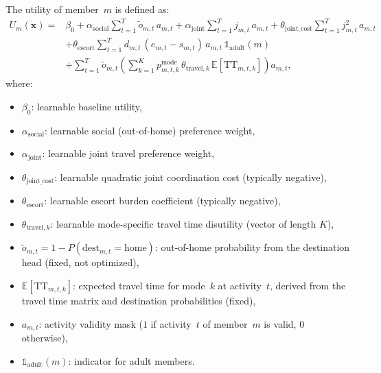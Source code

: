 \documentclass[11pt,a4paper]{article}
\newcommand{\indicator}{\mathbb{1}}
\newcommand{\E}{\mathbb{E}}
\begin{document}
The utility of member~$m$ is defined as:
\begin{equation}
\begin{split}
    U_m(\mathbf{x}) ={} & \beta_0
    + \alpha_{\mathrm{social}} \sum_{t=1}^{T} \tilde{o}_{m,t} \, a_{m,t}
    + \alpha_{\mathrm{joint}} \sum_{t=1}^{T} j_{m,t} \, a_{m,t}
    + \theta_{\mathrm{joint\_cost}} \sum_{t=1}^{T} j_{m,t}^2 \, a_{m,t} \\
    & + \theta_{\mathrm{escort}} \sum_{t=1}^{T} d_{m,t} \,(e_{m,t} - s_{m,t})\, a_{m,t} \, \indicator_{\mathrm{adult}}(m) \\
    & + \sum_{t=1}^{T} \tilde{o}_{m,t} \left( \sum_{k=1}^{K} p^{\mathrm{mode}}_{m,t,k} \, \theta_{\mathrm{travel},k} \, \E[\mathrm{TT}_{m,t,k}] \right) a_{m,t},
\end{split}
    \label{eq:utility}
\end{equation}
where:
\begin{itemize}
    \item $\beta_0$: learnable baseline utility,
    \item $\alpha_{\mathrm{social}}$: learnable social (out-of-home) preference weight,
    \item $\alpha_{\mathrm{joint}}$: learnable joint travel preference weight,
    \item $\theta_{\mathrm{joint\_cost}}$: learnable quadratic joint coordination cost (typically negative),
    \item $\theta_{\mathrm{escort}}$: learnable escort burden coefficient (typically negative),
    \item $\theta_{\mathrm{travel},k}$: learnable mode-specific travel time disutility (vector of length $K$),
    \item $\tilde{o}_{m,t} = 1 - P(\mathrm{dest}_{m,t} = \mathrm{home})$: out-of-home probability from the destination head (fixed, not optimized),
    \item $\E[\mathrm{TT}_{m,t,k}]$: expected travel time for mode~$k$ at activity~$t$, derived from the travel time matrix and destination probabilities (fixed),
    \item $a_{m,t}$: activity validity mask ($1$ if activity~$t$ of member~$m$ is valid, $0$ otherwise),
    \item $\indicator_{\mathrm{adult}}(m)$: indicator for adult members.
\end{itemize}
\end{document}
